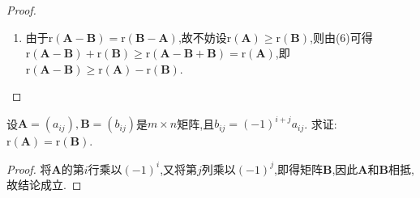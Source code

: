 \documentclass[lang=cn,newtx,10pt,scheme=chinese]{elegantbook}
\begin{document}
\begin{proof}
\begin{enumerate}[(1)]
\item 由于\(\mathrm{r}(\boldsymbol{A}-\boldsymbol{B})=\mathrm{r}(\boldsymbol{B}-\boldsymbol{A})\),故不妨设\(\mathrm{r}(\boldsymbol{A})\geq\mathrm{r}(\boldsymbol{B})\),则由(6)可得\(\mathrm{r}(\boldsymbol{A}-\boldsymbol{B})+\mathrm{r}(\boldsymbol{B})\geq\mathrm{r}(\boldsymbol{A}-\boldsymbol{B}+\boldsymbol{B})=\mathrm{r}(\boldsymbol{A})\),即\(\mathrm{r}(\boldsymbol{A}-\boldsymbol{B})\geq\mathrm{r}(\boldsymbol{A})-\mathrm{r}(\boldsymbol{B})\).
\end{enumerate}
\end{proof}

\begin{example}
设\(\boldsymbol{A}=(a_{ij}),\boldsymbol{B}=(b_{ij})\)是\(m\times n\)矩阵,且\(b_{ij}=(-1)^{i + j}a_{ij}\). 求证:\(\mathrm{r}(\boldsymbol{A})=\mathrm{r}(\boldsymbol{B})\).
\end{example}
\begin{proof}
将\(\boldsymbol{A}\)的第\(i\)行乘以\((-1)^i\),又将第\(j\)列乘以\((-1)^j\),即得矩阵\(\boldsymbol{B}\),因此\(\boldsymbol{A}\)和\(\boldsymbol{B}\)相抵,故结论成立. 
\end{proof}
\end{document}

